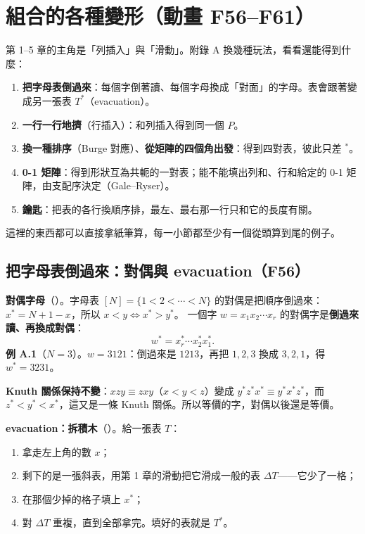 
\section{組合的各種變形（動畫 F56--F61）}\label{sec:f-appA}

\begin{keybox}
第 1--5 章的主角是「列插入」與「滑動」。附錄 A 換幾種玩法，看看還能得到什麼：
\begin{enumerate}[nosep]
\item \textbf{把字母表倒過來}：每個字倒著讀、每個字母換成「對面」的字母。表會跟著變成另一張表 $T^*$（evacuation）。
\item \textbf{一行一行地擠}（行插入）：和列插入得到同一個 $P$。
\item \textbf{換一種排序}（Burge 對應）、\textbf{從矩陣的四個角出發}：得到四對表，彼此只差 $^*$。
\item \textbf{0-1 矩陣}：得到形狀互為共軛的一對表；能不能填出列和、行和給定的 0-1 矩陣，由支配序決定（Gale–Ryser）。
\item \textbf{鑰匙}：把表的各行換順序排，最左、最右那一行只和它的長度有關。
\end{enumerate}
這裡的東西都可以直接拿紙筆算，每一小節都至少有一個從頭算到尾的例子。
\end{keybox}

\subsection{把字母表倒過來：對偶與 evacuation（F56）}\label{sec:f-evac}

\textbf{對偶字母}（）。字母表 $[N]=\{1<2<\cdots<N\}$ 的對偶是把順序倒過來：$x^*=N+1-x$，所以 $x<y\iff x^*>y^*$。
一個字 $w=x_1x_2\cdots x_r$ 的對偶字是\textbf{倒過來讀、再換成對偶}：
\[
w^*=x_r^*\cdots x_2^*x_1^* .
\]
\textbf{例 A.1}（$N=3$）。$w=3121$：倒過來是 $1213$，再把 $1,2,3$ 換成 $3,2,1$，得 $w^*=3231$。

\textbf{Knuth 關係保持不變}：$xzy\equiv zxy$（$x<y<z$）變成 $y^*z^*x^*\equiv y^*x^*z^*$，而 $z^*<y^*<x^*$，這又是一條 Knuth 關係。所以等價的字，對偶以後還是等價。

\textbf{evacuation：拆積木}（）。給一張表 $T$：
\begin{enumerate}[nosep]
\item 拿走左上角的數 $x$；
\item 剩下的是一張斜表，用第 1 章的滑動把它滑成一般的表 $\Delta T$——它少了一格；
\item 在那個少掉的格子填上 $x^*$；
\item 對 $\Delta T$ 重複，直到全部拿完。填好的表就是 $T^*$。
\end{enumerate}

